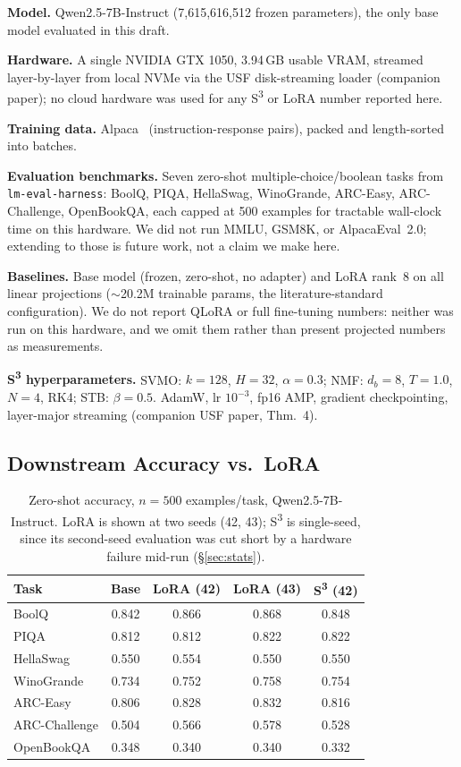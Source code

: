 \documentclass[conference]{IEEEtran}
\newcommand{\sthree}{S\textsuperscript{3}}
\begin{document}
\textbf{Model.} Qwen2.5-7B-Instruct (7{,}615{,}616{,}512 frozen parameters), the only base model evaluated in this draft.

\textbf{Hardware.} A single NVIDIA GTX 1050, 3.94\,GB usable VRAM, streamed layer-by-layer from local NVMe via the USF disk-streaming loader (companion paper); no cloud hardware was used for any \sthree{} or LoRA number reported here.

\textbf{Training data.} Alpaca~\cite{alpaca2023} (instruction-response pairs), packed and length-sorted into batches.

\textbf{Evaluation benchmarks.} Seven zero-shot multiple-choice/boolean tasks from \texttt{lm-eval-harness}: BoolQ, PIQA, HellaSwag, WinoGrande, ARC-Easy, ARC-Challenge, OpenBookQA, each capped at 500 examples for tractable wall-clock time on this hardware. We did not run MMLU, GSM8K, or AlpacaEval~2.0; extending to those is future work, not a claim we make here.

\textbf{Baselines.} Base model (frozen, zero-shot, no adapter) and LoRA rank~8 on all linear projections ($\sim$20.2M trainable params, the literature-standard configuration). We do not report QLoRA or full fine-tuning numbers: neither was run on this hardware, and we omit them rather than present projected numbers as measurements.

\textbf{\sthree{} hyperparameters.} SVMO: $k=128$, $H=32$, $\alpha=0.3$; NMF: $d_b=8$, $T=1.0$, $N=4$, RK4; STB: $\beta=0.5$. AdamW, lr $10^{-3}$, fp16 AMP, gradient checkpointing, layer-major streaming (companion USF paper, Thm.~4).

\subsection{Downstream Accuracy vs.\ LoRA}
\label{sec:main-results}

\begin{table}[t]
\centering
\caption{Zero-shot accuracy, $n{=}500$ examples/task, Qwen2.5-7B-Instruct. LoRA is shown at two seeds (42, 43); \sthree{} is single-seed, since its second-seed evaluation was cut short by a hardware failure mid-run (\S\ref{sec:stats}).}
\label{tab:main}
\footnotesize
\setlength{\tabcolsep}{3pt}
\begin{tabular}{@{}lcccc@{}}
\toprule
\textbf{Task} & \textbf{Base} & \textbf{LoRA (42)} & \textbf{LoRA (43)} & \textbf{\sthree{} (42)} \\
\midrule
BoolQ         & 0.842 & 0.866 & 0.868 & 0.848 \\
PIQA          & 0.812 & 0.812 & 0.822 & 0.822 \\
HellaSwag     & 0.550 & 0.554 & 0.550 & 0.550 \\
WinoGrande    & 0.734 & 0.752 & 0.758 & 0.754 \\
ARC-Easy      & 0.806 & 0.828 & 0.832 & 0.816 \\
ARC-Challenge & 0.504 & 0.566 & 0.578 & 0.528 \\
OpenBookQA    & 0.348 & 0.340 & 0.340 & 0.332 \\
\bottomrule
\end{tabular}
\end{table}
\end{document}

